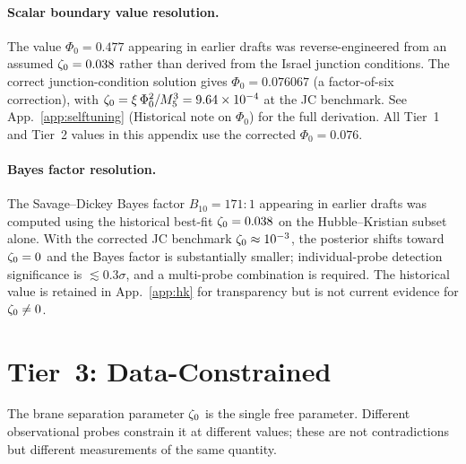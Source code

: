 \paragraph{Scalar boundary value resolution.}
The value $\Phi_0 = 0.477$ appearing in earlier drafts was reverse-engineered from an assumed $\zeta_0 = 0.038$ rather than derived from the Israel junction conditions. The correct junction-condition solution gives $\Phi_0 = 0.076067$ (a factor-of-six correction), with $\zeta_0 = \xi\,\Phi_0^2/M_5^3 = 9.64 \times 10^{-4}$ at the JC benchmark. See App.~\ref{app:selftuning} (Historical note on $\Phi_0$) for the full derivation. All Tier~1 and Tier~2 values in this appendix use the corrected $\Phi_0 = 0.076$.

\paragraph{Bayes factor resolution.}
The Savage--Dickey Bayes factor $B_{10} = 171\!:\!1$ appearing in earlier drafts was computed using the historical best-fit $\zeta_0 = 0.038$ on the Hubble--Kristian subset alone. With the corrected JC benchmark $\zeta_0 \approx 10^{-3}$, the posterior shifts toward $\zeta_0 = 0$ and the Bayes factor is substantially smaller; individual-probe detection significance is $\lesssim 0.3\sigma$, and a multi-probe combination is required. The historical value is retained in App.~\ref{app:hk} for transparency but is not current evidence for $\zeta_0 \neq 0$.

\section{Tier~3: Data-Constrained}
\label{app:val-tier3}

The brane separation parameter $\zeta_0$ is the single free parameter. Different observational probes constrain it at different values; these are not contradictions but different measurements of the same quantity.

